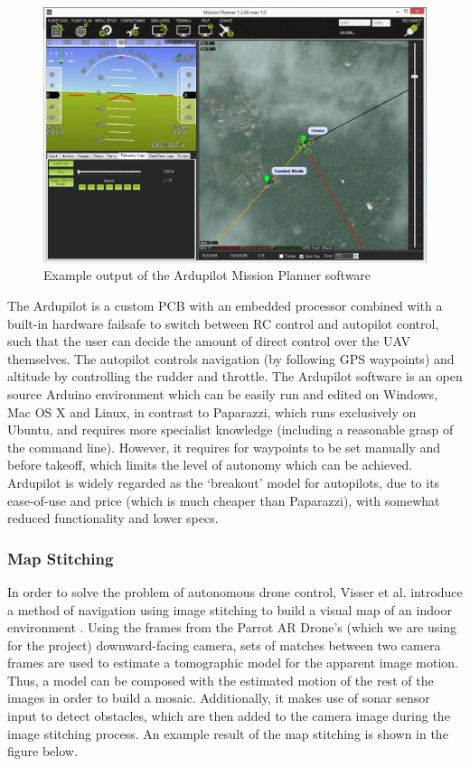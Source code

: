 \begin{figure}
\centering	
\includegraphics[scale=0.2]{img/ardgui}	
\caption{Example output of  the Ardupilot Mission Planner software}
\end{figure}

The Ardupilot is a custom PCB with an embedded processor combined with a built-in hardware failsafe to switch between RC control and autopilot control, such that the user can decide the amount of direct control over the UAV themselves. The autopilot controls navigation (by following GPS waypoints) and altitude by controlling the rudder and throttle.
The Ardupilot software is an open source Arduino environment which can be easily run and edited on Windows, Mac OS X and Linux, in contrast to Paparazzi, which runs exclusively on Ubuntu, and requires more specialist knowledge (including a reasonable grasp of the command line). However, it requires for waypoints to be set manually and before takeoff, which limits the level of autonomy which can be achieved. Ardupilot is widely regarded as the ‘breakout’ model for autopilots, due to its ease-of-use and price (which is much cheaper than Paparazzi), with somewhat reduced functionality and lower specs.

\subsubsection{Map Stitching}
In order to solve the problem of autonomous drone control, Visser et al. introduce a method of navigation using image stitching to build a visual map of an indoor environment \cite{arnoudvisser2011}. Using the frames from the Parrot AR Drone’s (which we are using for the project) downward-facing camera, sets of matches between two camera frames are used to estimate a tomographic model for the apparent image motion. Thus, a model can be composed with the estimated motion of the rest of the images in order to build a mosaic. Additionally, it makes use of sonar sensor input to detect obstacles, which are then added to the camera image during the image stitching process. An example result of the map stitching is shown in the figure below.

